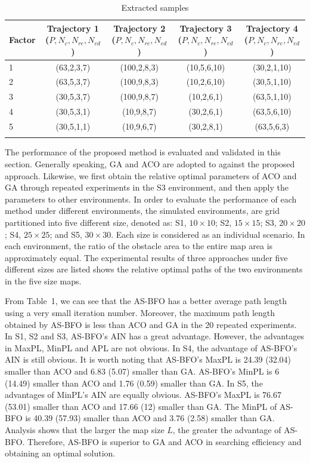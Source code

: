 \documentclass{PDS}%
\theoremstyle{definition}
\begin{document}
\begin{table}[h]
\centering
\caption{Extracted samples\label{table:samples}}
\begin{tabular}{@{\extracolsep\fill}lcccc@{\extracolsep\fill}}
\toprule
Factor & \multicolumn{1}{p{6pc}}{\centering Trajectory 1 ($P,N_c,N_{re},N_{ed}$)}
& \multicolumn{1}{p{6pc}}{\centering Trajectory 2 ($P,N_c,N_{re},N_{ed}$)}
& \multicolumn{1}{p{6pc}}{\centering Trajectory 3 ($P,N_c,N_{re},N_{ed}$)}
& \multicolumn{1}{p{6pc}}{\centering Trajectory 4 ($P,N_c,N_{re},N_{ed}$)} \\
\midrule
 1 & (63,2,3,7) & (100,2,8,3) & (10,5,6,10) & (30,2,1,10) \\
 2 & (63,5,3,7) & (100,9,8,3) & (10,2,6,10) & (30,5,1,10) \\
 3 & (30,5,3,7) & (100,9,8,7) & (10,2,6,1) & (63,5,1,10) \\
 4 & (30,5,3,1) & (10,9,8,7) & (30,2,6,1) & (63,5,6,10) \\
 5 & (30,5,1,1) & (10,9,6,7) & (30,2,8,1) & (63,5,6,3) \\
\botrule
\end{tabular}
\end{table}

The performance of the proposed method is evaluated and validated in this section. Generally
speaking, GA and ACO are adopted to against the proposed approach. Likewise, we first
obtain the relative optimal parameters of ACO and GA through repeated experiments in the
S3 environment, and then apply the parameters to other environments. In order to
evaluate the performance of each method under different environments, the simulated
environments, are grid partitioned into five different
size, denoted as: S1, $10\times 10$; S2, $15\times 15$; S3, $20\times 20$; S4, $25\times 25$; and S5, $30\times 30$. Each size is considered as an individual scenario. In each
environment, the ratio of the obstacle area to the entire map area is approximately
equal. The experimental results of three approaches under five different sizes are listed shows the relative optimal paths of the
two environments in the five size maps.

From Table~1, we can see that the AS-BFO has a better average path
length using a very small iteration number. Moreover, the maximum path length obtained by
AS-BFO is less than ACO and GA in the 20 repeated experiments. In S1, S2 and S3,
AS-BFO's AIN has a great advantage. However, the advantages in MaxPL, MinPL and APL are
not obvious. In S4, the advantage of AS-BFO's AIN is still obvious. It is worth noting
that AS-BFO's MaxPL is 24{.}39 (32{.}04) smaller than ACO and 6{.}83 (5{.}07) smaller than GA.
AS-BFO's MinPL is 6 (14{.}49) smaller than ACO and 1{.}76 (0{.}59) smaller than GA. In S5, the
advantages of MinPL's AIN are equally obvious. AS-BFO's MaxPL is 76{.}67 (53{.}01) smaller
than ACO and 17{.}66 (12) smaller than GA. The MinPL of AS-BFO is 40{.}39 (57{.}93) smaller
than ACO and 3{.}76 (2{.}58) smaller than GA. Analysis shows that the larger the map size $L$,
the greater the advantage of AS-BFO. Therefore, AS-BFO is superior to GA and ACO in
searching efficiency and obtaining an optimal solution.
\end{document}
